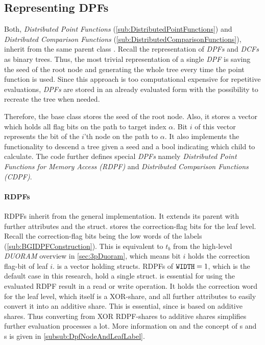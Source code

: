 \subsection*{Representing DPFs} \label{subsub:implementationRepresentingDPFs}
Both, \textit{Distributed Point Functions} (\ref{sub:DistributedPointFunctions}) and \textit{Distributed Comparison Functions} (\ref{sub:DistributedComparisonFunctions}), inherit from the same parent class .
Recall the representation of \textit{DPFs} and \textit{DCFs} as binary trees.
Thus, the most trivial representation of a single \textit{DPF} is saving the seed of the root node and generating the whole tree every time the point function is used.
Since this approach is too computational expensive for repetitive evaluations, \textit{DPFs} are stored in an already evaluated form with the possibility to recreate the tree when needed.

Therefore, the base class  stores the seed of the root node.
Also, it stores a vector  which holds all flag bits on the path to target index $\alpha$.
Bit $i$ of this vector represents the bit of the $i$'th node on the path to $\alpha$.
It also implements the functionality to descend a tree given a seed and a bool indicating which child to calculate.
The code further defines special \textit{DPFs} namely \textit{Distributed Point Functions for Memory Access (RDPF)} and \textit{Distributed Comparison Functions (CDPF)}.

\paragraph{RDPFs}\label{par:preliminariesRDPFs}
RDPFs inherit from the general  implementation.
It extends its parent with further attributes and the  struct.
 stores the correction-flag bits for the leaf level.
Recall the correction-flag bits being the low words of the labels (\ref{sub:BGIDPFConstruction}).
This is equivalent to $t_b$ from the high-level \textit{DUORAM} overview in \ref{sec:3pDuoram}, which means bit $i$ holds the correction flag-bit of leaf $i$.
 is a vector holding  structs.
RDPFs of $\code{WIDTH}=1$, which is the default case in this research, hold a single  struct.
 is essential for using the evaluated RDPF result in a read or write operation.
It holds the correction word for the leaf level, which itself is a XOR-share, and all further attributes to easily convert it into an additive share.
This is essential, since  is based on additive shares. 
Thus converting from XOR RDPF-shares to additive shares simplifies further evaluation processes a lot.
More information on  and the concept of s and s is given in \ref{subsub:DpfNodeAndLeafLabel}.

